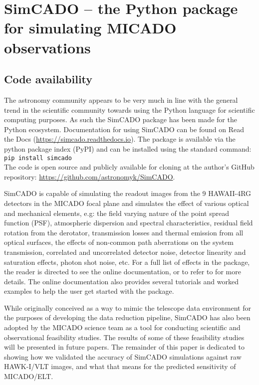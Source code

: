 \section{SimCADO -- the Python package for simulating MICADO observations}
\label{sec:scope}


\subsection{Code availability}


The astronomy community appears to be very much in line with the general trend in the scientific community towards using the Python language for scientific computing purposes. As such the SimCADO package has been made for the Python ecosystem. Documentation for using SimCADO can be found on Read the Docs (\url{https://simcado.readthedocs.io}). The package is available via the python package index (PyPI) and can be installed using the standard command:\\

\verb+pip install simcado+\\

The code is open source and publicly available for cloning at the author's GitHub repository: \url{https://github.com/astronomyk/SimCADO}. 

SimCADO is capable of simulating the readout images from the 9 HAWAII-4RG detectors in the MICADO focal plane and simulates the effect of various optical and mechanical elements, e.g: the field varying nature of the point spread function (PSF), atmospheric dispersion and spectral characteristics, residual field rotation from the derotator, transmission losses and thermal emission from all optical surfaces, the effects of non-common path aberrations on the system transmission, correlated and uncorrelated detector noise, detector linearity and saturation effects, photon shot noise, etc. For a full list of effects in the package, the reader is directed to see the online documentation, or to refer to \citet{leschinski2016} for more details. The online documentation also provides several tutorials and worked examples to help the user get started with the package.

While originally conceived as a way to mimic the telescope data environment for the purposes of developing the data reduction pipeline, SimCADO has also been adopted by the MICADO science team as a tool for conducting scientific and observational feasibility studies. The results of some of these feasibility studies will be presented in future papers. The remainder of this paper is dedicated to showing how we validated the accuracy of SimCADO simulations against raw HAWK-I/VLT images, and what that means for the predicted sensitivity of MICADO/ELT.


